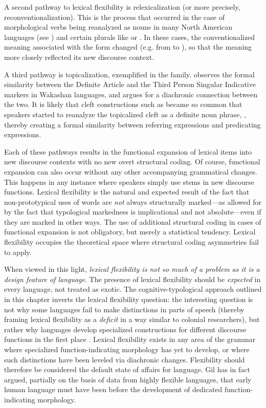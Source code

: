 A second pathway to lexical flexibility is relexicalization (or more precisely, reconventionalization). This is the process that occurred in the case of morphological verbs being reanalyzed as nouns in many North American languages (see ) and certain  plurals like  or . In these cases, the conventionalized meaning associated with the form changed (e.g. from   to ), so that the meaning more closely reflected its new discourse context.

A third pathway is topicalization, exemplified in the  family. \textcite[122, 142]{Jacobsen1979} observes the formal similarity between the Definite Article and the Third Person Singular Indicative markers in Wakashan languages, and argues for a diachronic connection between the two. It is likely that cleft constructions such as  became so common that speakers started to reanalyze the topicalized cleft as a definite noun phrase, , thereby creating a formal similarity between referring expressions and predicating expressions.

Each of these pathways results in the functional expansion of lexical items into new discourse contexts with no new overt structural coding. Of course, functional expansion can also occur without any other accompanying grammatical changes. This happens in any instance where speakers simply use stems in new discourse functions. Lexical flexibility is the natural and expected result of the fact that non-prototypical uses of words are \emph{not} always structurally marked—as allowed for by the fact that typological markedness is implicational and not absolute—even if they are marked in other ways. The use of additional structural coding in cases of functional expansion is not obligatory, but merely a statistical tendency. Lexical flexibility occupies the theoretical space where structural coding asymmetries fail to apply.

When viewed in this light, \emph{lexical flexibility is not so much of a problem as it is a design feature of language}. The presence of lexical flexibility should be \emph{expected} in every language, not treated as exotic. The cognitive-typological approach outlined in this chapter inverts the lexical flexibility question: the interesting question is not why some languages fail to make distinctions in parts of speech (thereby framing lexical flexibility as a \emph{deficit} in a way similar to colonial researchers), but rather why languages develop specialized constructions for different discourse functions in the first place . Lexical flexibility exists in any area of the grammar where specialized function-indicating morphology has yet to develop, or where such distinctions have been leveled via diachronic changes. Flexibility should therefore be considered the default state of affairs for language. Gil \parencites*{Gil2005}{Gil2006} has in fact argued, partially on the basis of data from highly flexible languages, that early human language must have been  before the development of dedicated function-indicating morphology.

